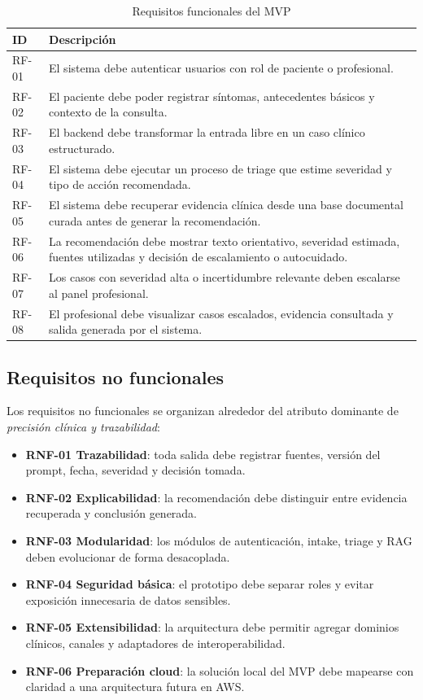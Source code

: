 \documentclass[12pt]{article}
\begin{document}
\begin{table}[ht]
\caption{Requisitos funcionales del MVP}
\label{tab:functional_requirements}
\centering
\begin{tabularx}{\textwidth}{>{\raggedright\arraybackslash}p{1.4cm} X}
\toprule
\textbf{ID} & \textbf{Descripción} \\
\midrule
RF-01 & El sistema debe autenticar usuarios con rol de paciente o profesional. \\
RF-02 & El paciente debe poder registrar síntomas, antecedentes básicos y contexto de la consulta. \\
RF-03 & El backend debe transformar la entrada libre en un caso clínico estructurado. \\
RF-04 & El sistema debe ejecutar un proceso de triage que estime severidad y tipo de acción recomendada. \\
RF-05 & El sistema debe recuperar evidencia clínica desde una base documental curada antes de generar la recomendación. \\
RF-06 & La recomendación debe mostrar texto orientativo, severidad estimada, fuentes utilizadas y decisión de escalamiento o autocuidado. \\
RF-07 & Los casos con severidad alta o incertidumbre relevante deben escalarse al panel profesional. \\
RF-08 & El profesional debe visualizar casos escalados, evidencia consultada y salida generada por el sistema. \\
\bottomrule
\end{tabularx}
\end{table}

\subsection{Requisitos no funcionales}

Los requisitos no funcionales se organizan alrededor del atributo dominante de \textit{precisión clínica y trazabilidad}:

\begin{itemize}[leftmargin=*]
  \item \textbf{RNF-01 Trazabilidad}: toda salida debe registrar fuentes, versión del prompt, fecha, severidad y decisión tomada.
  \item \textbf{RNF-02 Explicabilidad}: la recomendación debe distinguir entre evidencia recuperada y conclusión generada.
  \item \textbf{RNF-03 Modularidad}: los módulos de autenticación, intake, triage y RAG deben evolucionar de forma desacoplada.
  \item \textbf{RNF-04 Seguridad básica}: el prototipo debe separar roles y evitar exposición innecesaria de datos sensibles.
  \item \textbf{RNF-05 Extensibilidad}: la arquitectura debe permitir agregar dominios clínicos, canales y adaptadores de interoperabilidad.
  \item \textbf{RNF-06 Preparación cloud}: la solución local del MVP debe mapearse con claridad a una arquitectura futura en AWS.
\end{itemize}
\end{document}
